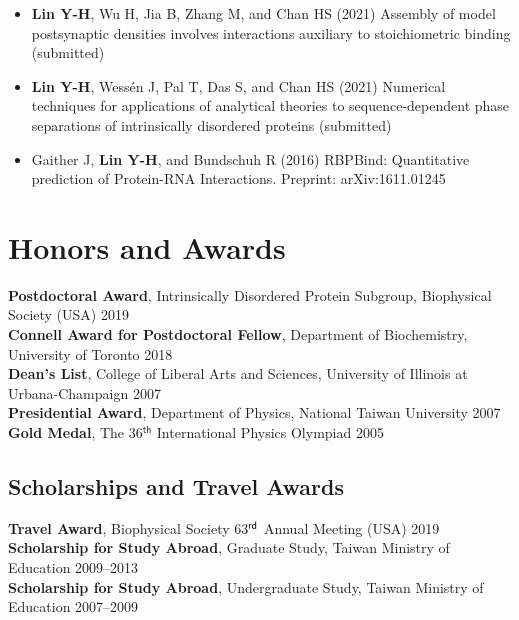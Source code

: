 \documentclass[11pt]{../yhlcv}
\def\tname#1{{\bf #1}}
\begin{document}
\begin{itemize}[leftmargin=*]

\item 
\tname{Lin Y-H}, Wu H, Jia B, Zhang M, and Chan HS (2021)
Assembly of model postsynaptic densities involves interactions auxiliary to stoichiometric binding (submitted)

\item
\tname{Lin Y-H}, Wessén J, Pal T, Das S, and Chan HS (2021)
Numerical techniques for applications of analytical theories to sequence-dependent phase separations of intrinsically disordered proteins (submitted)

\item 
Gaither J, \tname{Lin Y-H}, and Bundschuh R (2016) 
RBPBind: Quantitative prediction of Protein-RNA Interactions. 
Preprint: arXiv:1611.01245 %

\end{itemize} 

\section*{Honors and Awards}

\noindent
{\bf Postdoctoral Award}, Intrinsically Disordered Protein Subgroup, Biophysical Society (USA) \hfill 2019 \\
{\bf Connell Award for Postdoctoral Fellow}, Department of Biochemistry, University of Toronto \hfill 2018 \\
{\bf Dean's List}, College of Liberal Arts and Sciences, University of Illinois at Urbana-Champaign \hfill 2007 \\
{\bf Presidential Award}, Department of Physics, National Taiwan University \hfill 2007 \\
{\bf Gold Medal}, The 36$^{ \mathsf{th}}$ International Physics Olympiad \hfill 2005

\subsection*{Scholarships and Travel Awards} 
{\bf Travel Award}, Biophysical Society 63$^{\sf rd}$ Annual Meeting (USA) \hfill 2019 \\
{\bf Scholarship for Study Abroad}, Graduate Study, Taiwan Ministry of Education \hfill 2009--2013 \\
{\bf Scholarship for Study Abroad}, Undergraduate Study, Taiwan Ministry of Education \hfill 2007--2009 
\end{document}
